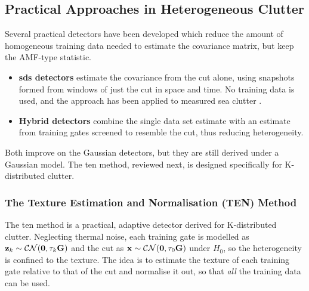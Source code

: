 \documentclass[12pt, a4paper]{report}
\begin{document}
\subsection{Practical Approaches in Heterogeneous Clutter}
\label{sec:practical}
Several practical detectors have been developed which reduce the amount of homogeneous training data needed to estimate the covariance matrix, but keep the AMF-type statistic.
\begin{itemize}
    \item \textbf{\Gls{sds} detectors} \cite{Aboutanios2005} estimate the covariance from the \gls{cut} alone, using snapshots formed from windows of just the \gls{cut} in space and time. No training data is used, and the approach has been applied to measured sea clutter \cite{Aboutanios2019}.
    \item \textbf{Hybrid detectors} \cite{Aboutanios2010} combine the single data set estimate with an estimate from training gates screened to resemble the \gls{cut}, thus reducing heterogeneity.
\end{itemize}
Both improve on the Gaussian detectors, but they are still derived under a Gaussian model. The \gls{ten} method, reviewed next, is designed specifically for K-distributed clutter.\\

\subsubsection{The Texture Estimation and Normalisation (TEN) Method}
\label{sec:ten}
The \gls{ten} method \cite{Aboutanios2020} is a practical, adaptive detector derived for K-distributed clutter. Neglecting thermal noise, each training gate is modelled as $\vb z_k\sim\mathcal{CN}(\vb 0,\tau_k\mathbf{G})$ and the \gls{cut} as $\vb x\sim\mathcal{CN}(\vb 0,\tau_0\mathbf{G})$ under $H_0$, so the heterogeneity is confined to the texture. The idea is to estimate the texture of each training gate relative to that of the \gls{cut} and normalise it out, so that \emph{all} the training data can be used.
\end{document}
